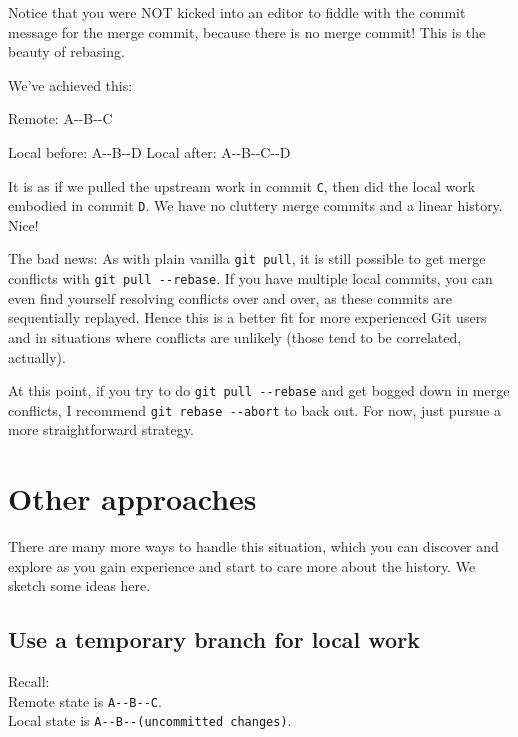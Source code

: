 \documentclass[
]{book}
\newenvironment{Shaded}{\begin{snugshade}}{\end{snugshade}}
\newcommand{\ExtensionTok}[1]{#1}
\newcommand{\NormalTok}[1]{#1}
\begin{document}
Notice that you were NOT kicked into an editor to fiddle with the commit message for the merge commit, because there is no merge commit! This is the beauty of rebasing.

We've achieved this:

\begin{Shaded}
\begin{Highlighting}[]
      \ExtensionTok{Remote:}\NormalTok{ A{-}{-}B{-}{-}C}

\ExtensionTok{Local}\NormalTok{ before: A{-}{-}B{-}{-}D}
 \ExtensionTok{Local}\NormalTok{ after: A{-}{-}B{-}{-}C{-}{-}D}
\end{Highlighting}
\end{Shaded}

It is as if we pulled the upstream work in commit \texttt{C}, then did the local work embodied in commit \texttt{D}. We have no cluttery merge commits and a linear history. Nice!

The bad news: As with plain vanilla \texttt{git\ pull}, it is still possible to get merge conflicts with \texttt{git\ pull\ -\/-rebase}. If you have multiple local commits, you can even find yourself resolving conflicts over and over, as these commits are sequentially replayed. Hence this is a better fit for more experienced Git users and in situations where conflicts are unlikely (those tend to be correlated, actually).

At this point, if you try to do \texttt{git\ pull\ -\/-rebase} and get bogged down in merge conflicts, I recommend \texttt{git\ rebase\ -\/-abort} to back out. For now, just pursue a more straightforward strategy.

\section{Other approaches}\label{other-approaches}

There are many more ways to handle this situation, which you can discover and explore as you gain experience and start to care more about the history. We sketch some ideas here.

\subsection{Use a temporary branch for local work}\label{use-a-temporary-branch-for-local-work}

Recall:\\
Remote state is \texttt{A-\/-B-\/-C}.\\
Local state is \texttt{A-\/-B-\/-(uncommitted\ changes)}.
\end{document}
